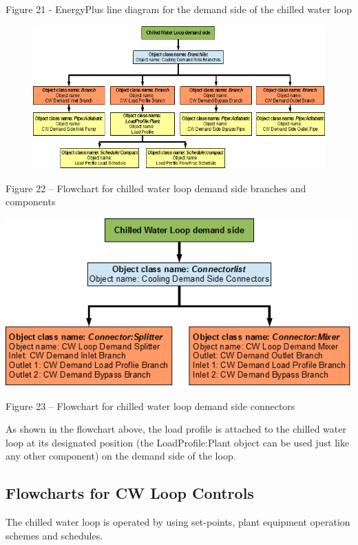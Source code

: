 Figure 21 - EnergyPlus line diagram for the demand side of the chilled water loop

\begin{figure}[htbp]
\centering
\includegraphics{media/image022.png}
\caption{}
\end{figure}

Figure 22 -- Flowchart for chilled water loop demand side branches and components

\textbf{\includegraphics{media/image023.png}}

Figure 23 -- Flowchart for chilled water loop demand side connectors

As shown in the flowchart above, the load profile is attached to the chilled water loop at its designated position (the LoadProfile:Plant object can be used just like any other component) on the demand side of the loop.

\subsection{Flowcharts for CW Loop Controls}\label{flowcharts-for-cw-loop-controls}

The chilled water loop is operated by using set-points, plant equipment operation schemes and schedules.

